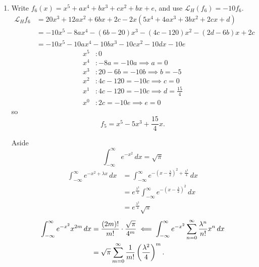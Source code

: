 \documentclass[10pt, a4paper]{article}
\begin{document}
\begin{problem}
\begin{solution}
\begin{enumerate}[label = (\alph*)]
            \item
            Write
            $f_6(x) = x ^ 5 + ax ^ 4 + bx ^ 3 + cx ^ 2 + bx + e$,
            and use $\mathcal{L}_H(f_6) = -10f_6$.
            \[
            \]
            \begin{align*}
                \mathcal{L}_Hf_6 &= 20x ^ 3 + 12ax ^ 2 + 6bx + 2c - 2x(5x ^ 4 + 4ax ^ 3 + 3bx ^ 2 + 2cx + d) \\
                &= -10x ^ 5 - 8ax ^ 4 - (6b - 20)x ^ 3 - (4c - 120)x ^ 2 - (2d - 6b)x + 2c \\
                &= -10x ^ 5 - 10ax ^ 4 - 10bx ^ 3 - 10cx ^ 2 - 10dx - 10e
            \end{align*}
            \begin{align*}
                x ^ 5 &: 0 \\
                x ^ 4 &: -8a = -10a \implies a = 0 \\
                x ^ 3 &: 20 - 6b = -10b \implies b = -5 \\
                x ^ 2 &: 4c - 120 = -10c \implies c = 0 \\
                x ^ 1 &: 4c - 120 = -10c \implies d = \frac{15}{4} \\
                x ^ 0 &: 2c = -10e \implies e = 0
            \end{align*}
            so
            \[
            f_5 = x ^ 5 - 5x ^ 3 + \frac{15}{4}x.
            \]

            Aside
            \[
            \int_{-\infty}^{\infty}e ^ {-x ^ 2}\,dx = \sqrt{\pi}
            \]
            \begin{align*}
                \int_{-\infty}^{\infty}e ^ {-x ^ 2 + \lambda x}\,dx &= \int_{-\infty}^{\infty}e ^ {-\left(x - \frac{\lambda}{2}\right) ^ 2 + \frac{\lambda ^ 2}{4}}\,dx \\
                &= e ^ {\frac{\lambda ^ 2}{4}}\int_{-\infty}^{\infty}e ^ {-\left(x - \frac{\lambda}{2}\right) ^ 2}\,dx \\
                &= e ^ {\frac{\lambda ^ 2}{4}}\sqrt{\pi}
            \end{align*}
            \begin{align*}
                \int_{-\infty}^{\infty}e ^ {-x ^ 2}x ^ {2m}\,dx &= \frac{(2m)!}{m!}\cdot \frac{\sqrt{\pi}}{4 ^ m} \impliedby \int_{-\infty}^{\infty}e ^ {-x ^ 2}\infsum[n = 0]\frac{\lambda ^ n}{n!}x ^ n\,dx \\
                &= \sqrt{\pi}\infsum[m = 0]\frac{1}{m!}\left(\frac{\lambda ^ 2}{4}\right) ^ m.
            \end{align*}
        \end{enumerate}
    \end{solution}
\end{problem}
\end{document}
